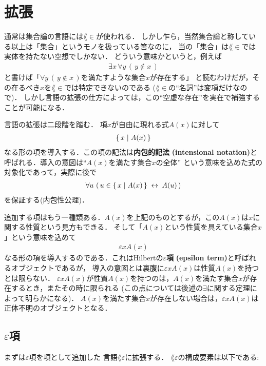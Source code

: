 \section{拡張}
	通常は集合論の言語には$\lang{\in}$が使われる．
	しかし乍ら，当然集合論と称している以上は「集合」というモノを扱っている筈なのに，
	当の「集合」は$\lang{\in}$では実体を持たない空想でしかない．
	どういう意味かというと，例えば
	\begin{align}	
		\exists x\, \forall y\, (\, y \notin x\, )
	\end{align}
	と書けば「$\forall y\, (\, y \notin x\, )$を満たすような集合$x$が存在する」
	と読むわけだが，その在るべき$x$を$\lang{\in}$では特定できないのである
	($\lang{\in}$の``名詞''は変項だけなので)．
	しかし言語の拡張の仕方によっては，この``空虚な存在''を実在で補強することが可能になる．
	
	言語の拡張は二段階を踏む．
	項$x$が自由に現れる式$A(x)$に対して
	\begin{align}
		\{\, x \mid A(x)\, \}
	\end{align}
	なる形の項を導入する．この項の記法は{\bf 内包的記法}
	{\bf (intensional notation)}と呼ばれる．導入の意図は``$A(x)$を満たす集合$x$の全体''
	という意味を込めた式の対象化であって，実際に後で
	\begin{align}
		\forall u\, \left(\, u \in \{\, x \mid A(x)\, \} \hspace{0.25em}\leftrightarrow\hspace{0.25em} A(u)\, \right)
	\end{align}
	を保証する(内包性公理)．
	
	追加する項はもう一種類ある．$A(x)$を上記のものとするが，この$A(x)$は$x$に関する性質という見方もできる．
	そして「$A(x)$という性質を具えている集合$x$」という意味を込めて
	\begin{align}
		\varepsilon x A(x)
	\end{align}
	なる形の項を導入するのである．これはHilbertの{\bf $\varepsilon$項}
	{\bf (epsilon term)}と呼ばれるオブジェクトであるが，
	導入の意図とは裏腹に$\varepsilon x A(x)$は性質$A(x)$を持つとは限らない．
	$\varepsilon x A(x)$が性質$A(x)$を持つのは，$A(x)$を満たす集合$x$が存在するとき，またその時に限られる
	(この点については後述の$\exists$に関する定理によって明らかになる)．
	$A(x)$を満たす集合$x$が存在しない場合は，$\varepsilon x A(x)$は正体不明のオブジェクトとなる．
	
\subsection{$\varepsilon$項}
	まずは$\varepsilon$項を項として追加した
	言語$\lang{\varepsilon}$に拡張する．
	$\lang{\varepsilon}$の構成要素は以下である:
	
